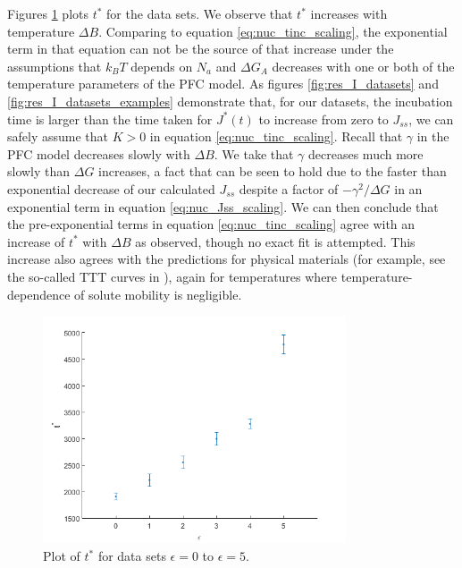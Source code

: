 Figures \ref{fig:res_tinc} plots $t^*$ for the data sets. We observe that $t^*$ increases with temperature $\Delta B$. Comparing to equation \ref{eq:nuc_tinc_scaling}, the exponential term in that equation can not be the source of that increase under the assumptions that $k_B T$ depends on $N_a$ and $\Delta G_A$ decreases with one or both of the temperature parameters of the PFC model. As figures \ref{fig:res_I_datasets} and \ref{fig:res_I_datasets_examples} demonstrate that, for our datasets, the incubation time is larger than the time taken for $J^*(t)$ to increase from zero to $J_{ss}$, we can safely assume that $K>0$ in equation \ref{eq:nuc_tinc_scaling}. Recall that $\gamma$ in the PFC model decreases slowly with $\Delta B$. We take that $\gamma$ decreases much more slowly than $\Delta G$ increases, a fact that can be seen to hold due to the faster than exponential decrease of our calculated $J_{ss}$ despite a factor of $-\gamma^2/\Delta G$ in an exponential term in equation \ref{eq:nuc_Jss_scaling}. We can then conclude that the pre-exponential terms in equation \ref{eq:nuc_tinc_scaling} agree with an increase of $t^*$ with $\Delta B$ as observed, though no exact fit is attempted. This increase also agrees with the predictions for physical materials (for example, see the so-called TTT curves in \cite{legoues84}), again for temperatures where temperature-dependence of solute mobility is negligible.

\begin{figure}[h]
\centering
\includegraphics[width=0.8\textwidth]{fig_res/res_tinc}
\caption{Plot of $t^*$ for data sets $\epsilon=0$ to $\epsilon=5$.}\label{fig:res_tinc}
\end{figure}


